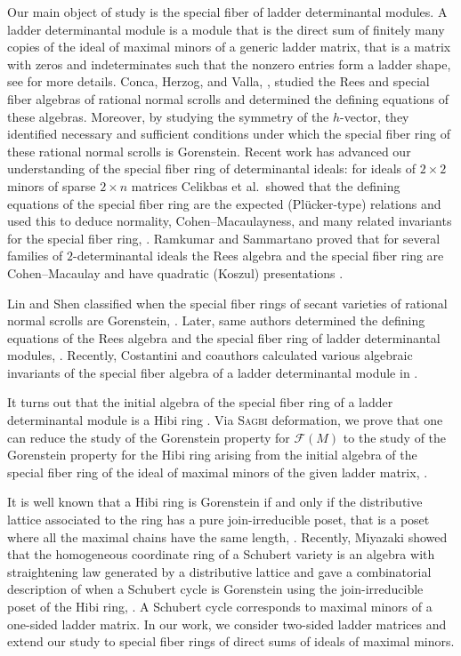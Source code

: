 \documentclass[11pt,a4paper,reqno,dvipsnames]{amsart}
\theoremstyle{plain}
\theoremstyle{definition}
\newtheorem{Assumptions and Discussion}[Theorem]{Assumptions and Discussion}
\theoremstyle{remark}
\newcommand\calF{\mathcal{F}}
\begin{document}
 Our main object of study is the special fiber of ladder determinantal modules. A ladder determinantal module is a module that is the direct sum of finitely many copies of the ideal of maximal minors of a generic ladder matrix, that is a matrix with zeros and indeterminates such that the nonzero entries form a ladder shape, see  for more details.  Conca, Herzog, and Valla,  \cite{CHV96}, studied the Rees and special fiber algebras of rational normal scrolls and determined the defining equations of these algebras. Moreover, by studying the symmetry of the \(h\)-vector, they identified necessary and sufficient conditions under which the special fiber ring of these rational normal scrolls is Gorenstein.  Recent work has advanced our understanding of the special fiber ring of determinantal ideals: for ideals of $2\times 2$ minors of sparse \(2\times n\) matrices Celikbas et al.\ showed that the defining equations of the special fiber ring are the expected (Plücker-type) relations and used this to deduce normality, Cohen–Macaulayness, and many related invariants for the special fiber ring, \cite{CDFGLPS}.  
Ramkumar and Sammartano proved that for several families of \(2\)-determinantal ideals  the Rees algebra and the special fiber ring are Cohen–Macaulay and have quadratic (Koszul) presentations \cite{RS}.


Lin and Shen classified when the special fiber rings of secant varieties of rational normal scrolls are Gorenstein, \cite{LSSecantNormal}.  Later,
same authors determined the defining equations of the Rees algebra and the special fiber ring of ladder determinantal modules, \cite[Theorem~5.5]{LinShenLadder}. Recently, Costantini and coauthors calculated various algebraic invariants of the special fiber algebra of a ladder determinantal module in \cite{CFGLLLM}. 

It turns out that the initial algebra of the special fiber ring of a ladder determinantal module is a Hibi ring  \cite[Theorem~4.8]{LinShenLadder}.  Via \textsc{Sagbi} deformation, we prove that one can reduce the study of the Gorenstein property for $\calF(M)$ to the study of the Gorenstein property for the Hibi ring arising from the initial algebra of the special fiber ring of the ideal of maximal minors of the given ladder matrix, .

It is well known that a Hibi ring is Gorenstein if and only if the distributive lattice associated to the ring has a pure join-irreducible poset, that is a poset where all the maximal chains have the same length, \cite{HibiDistLatt}. Recently, Miyazaki showed that the homogeneous coordinate ring of a Schubert variety is an algebra with straightening law generated by a distributive lattice and gave a combinatorial description of when a Schubert cycle is Gorenstein  using the join-irreducible poset of the Hibi ring, \cite{MiyazakiSchubert}. A Schubert cycle 
corresponds to maximal minors of a one-sided ladder matrix. In our work, we consider  two-sided ladder matrices and extend our study to special fiber rings of direct sums of ideals of maximal minors. 
\end{document}
